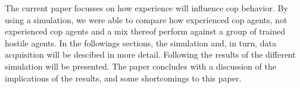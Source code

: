 The current paper focusses on how experience will influence cop behavior. By using a simulation, we were able to compare how experienced cop agents, not experienced cop agents and a mix thereof perform against a group of trained hostile agents. In the followings sections, the simulation and, in turn, data acquisition will be descibed in more detail. Following the results of the different simulation will be presented. The paper concludes with a discussion of the implications of the results, and some shortcomings to this paper. 